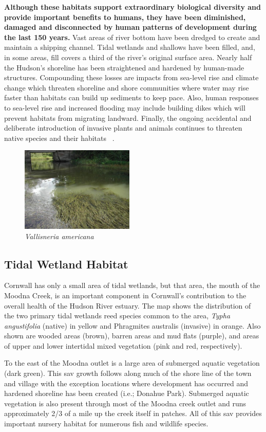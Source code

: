 \textbf{Although these habitats support extraordinary biological diversity and
provide important benefits to humans, they have been diminished, damaged and
disconnected by human patterns of development during the last 150 years.} Vast
areas of river bottom have been dredged to create and maintain a shipping
channel. Tidal wetlands and shallows have been filled, and, in some areas, fill
covers a third of the river's original surface area. Nearly half the Hudson's
shoreline has been straightened and hardened by human-made structures.
Compounding these losses are impacts from sea-level rise and climate change
which threaten shoreline and shore communities where water may rise faster than
habitats can build up sediments to keep pace. Also, human responses to
sea-level rise and increased flooding may include building dikes which will
prevent habitats from migrating landward. Finally, the ongoing accidental and
deliberate introduction of invasive plants and animals continues to threaten
native species and their habitats ~\citep{nysdosmoodna, anderson2013}.

\begin{figure}
    \includegraphics[width=0.48\textwidth]{images/Water_Celery.jpg}
  \caption{\textit{Vallisneria americana}}
\end{figure}

\subsection*{Tidal Wetland Habitat}
Cornwall has only a small area of tidal wetlands, but that area, the mouth of
the Moodna Creek, is an important component in Cornwall’s contribution to the
overall health of the Hudson River estuary. The map shows the distribution of
the two primary tidal wetlands reed species common to the area, \textit{Typha
angustifolia} (native) in yellow and Phragmites australis (invasive) in orange.
Also shown are wooded areas (brown), barren areas and mud flats (purple), and
areas of upper and lower intertidal mixed vegetation (pink and red,
respectively).
\par
To the east of the Moodna outlet is a large area of submerged aquatic vegetation 
(dark green). This \gls{sav} growth follows along much of the shore line of the 
town and village with the exception locations where development has occurred and 
hardened shoreline has been created (i.e.; Donahue Park). Submerged aquatic 
vegetation is also present through most of the Moodna creek outlet and runs 
approximately 2/3 of a mile up the creek itself in patches. All of this 
\gls{sav} provides important nursery habitat for numerous fish and wildlife 
species.

